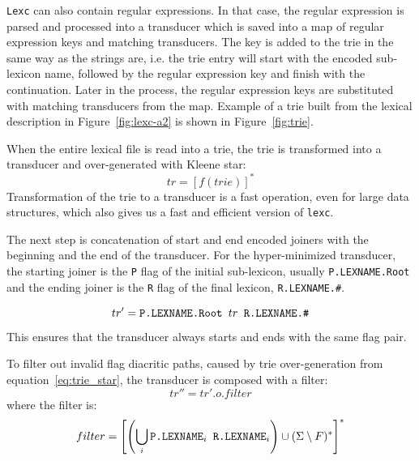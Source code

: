 \documentclass[11pt]{article}
\begin{document}
\texttt{Lexc} can also contain regular expressions. In that case, the regular expression is parsed and processed into a transducer which is saved into 
a map of regular expression keys and matching transducers. The key is added to the trie in the same way as the strings are, i.e. the trie entry will start with 
the encoded sub-lexicon name, followed by the regular expression key and finish with the continuation. Later in the process, the regular expression 
keys are substituted with matching transducers from the map. 
Example of a trie built from the lexical description in Figure~\ref{fig:lexc-a2} is shown in Figure~\ref{fig:trie}.

When the entire lexical file is read into a trie, the trie is transformed into a transducer and over-generated with Kleene star:
\begin{equation}\label{eq:trie_star}
tr = \left[f(trie)\right]^* 
\end{equation}
Transformation of the trie to a transducer is a fast operation, even for large data structures, which also gives us a fast and efficient version of \texttt{lexc}.

The next step is concatenation of start and end encoded joiners with the beginning and the end of the transducer. 
For the hyper-minimized transducer, the starting joiner is the \verb+P+ flag of the initial sub-lexicon, usually \texttt{P.LEXNAME.Root} and the ending joiner is the \verb+R+ flag of the final lexicon, \texttt{R.LEXNAME.\#}.

\begin{equation}\label{eq:joiners}
tr' = \verb+P.LEXNAME.Root + tr \verb+ R.LEXNAME.#+
\end{equation}
This ensures that the transducer always starts and ends with the same flag pair.

To filter out invalid flag diacritic paths, caused by trie over-generation from equation~\ref{eq:trie_star}, the transducer is composed with a filter:
\begin{equation}\label{eq:composition}
tr'' = tr' .o. filter
\end{equation}
where the filter is:
\begin{equation}\label{eq:filter}
filter = \left[ \left(\bigcup_{i} \verb+P.LEXNAME+_i \verb+ R.LEXNAME+_i \right) \cup (\Sigma \setminus F) ^*\right]^* 
\end{equation}
\end{document}
